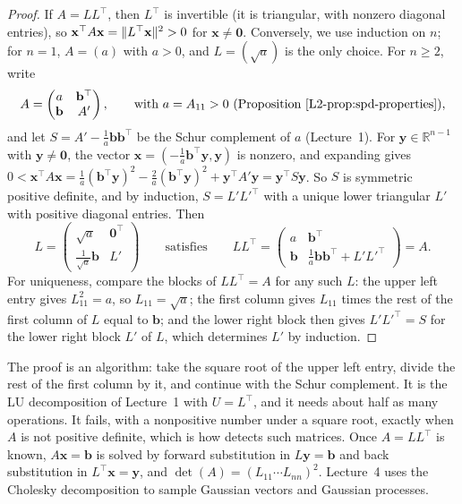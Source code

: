 \begin{proof}
    If $A = LL^\top$, then $L^\top$ is invertible (it is triangular, with nonzero diagonal entries), so $\mathbf{x}^\top A\mathbf{x} = \lVert L^\top\mathbf{x} \rVert^2 > 0$ for $\mathbf{x} \neq \mathbf{0}$. Conversely, we use induction on $n$; for $n = 1$, $A = (a)$ with $a > 0$, and $L = (\sqrt{a})$ is the only choice. For $n \geq 2$, write
    \[A = \begin{pmatrix} a & \mathbf{b}^\top \\ \mathbf{b} & A' \end{pmatrix}, \qquad \text{with } a = A_{11} > 0 \text{ (Proposition~\ref{L2-prop:spd-properties})},\]
    and let $S = A' - \frac{1}{a}\mathbf{b}\mathbf{b}^\top$ be the Schur complement of $a$ (Lecture~1). For $\mathbf{y} \in \mathbb{R}^{n-1}$ with $\mathbf{y} \neq \mathbf{0}$, the vector $\mathbf{x} = (-\frac{1}{a}\mathbf{b}^\top\mathbf{y}, \mathbf{y})$ is nonzero, and expanding gives $0 < \mathbf{x}^\top A\mathbf{x} = \frac{1}{a}(\mathbf{b}^\top\mathbf{y})^2 - \frac{2}{a}(\mathbf{b}^\top\mathbf{y})^2 + \mathbf{y}^\top A'\mathbf{y} = \mathbf{y}^\top S\mathbf{y}$. So $S$ is symmetric positive definite, and by induction, $S = L'L'^\top$ with a unique lower triangular $L'$ with positive diagonal entries. Then
    \[L = \begin{pmatrix} \sqrt{a} & \mathbf{0}^\top \\ \frac{1}{\sqrt{a}}\mathbf{b} & L' \end{pmatrix} \qquad \text{satisfies} \qquad LL^\top = \begin{pmatrix} a & \mathbf{b}^\top \\ \mathbf{b} & \frac{1}{a}\mathbf{b}\mathbf{b}^\top + L'L'^\top \end{pmatrix} = A.\]
    For uniqueness, compare the blocks of $LL^\top = A$ for any such $L$: the upper left entry gives $L_{11}^2 = a$, so $L_{11} = \sqrt{a}$; the first column gives $L_{11}$ times the rest of the first column of $L$ equal to $\mathbf{b}$; and the lower right block then gives $L'L'^\top = S$ for the lower right block $L'$ of $L$, which determines $L'$ by induction.
\end{proof}

The proof is an algorithm: take the square root of the upper left entry, divide the rest of the first column by it, and continue with the Schur complement. It is the LU decomposition of Lecture~1 with $U = L^\top$, and it needs about half as many operations. It fails, with a nonpositive number under a square root, exactly when $A$ is not positive definite, which is how  detects such matrices. Once $A = LL^\top$ is known, $A\mathbf{x} = \mathbf{b}$ is solved by forward substitution in $L\mathbf{y} = \mathbf{b}$ and back substitution in $L^\top\mathbf{x} = \mathbf{y}$, and $\det(A) = (L_{11} \cdots L_{nn})^2$. Lecture~4 uses the Cholesky decomposition to sample Gaussian vectors and Gaussian processes.

